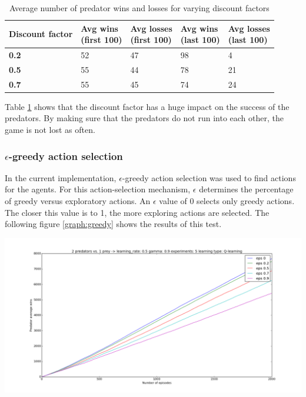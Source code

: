 \begin{table}[H]
\begin{center}
\begin{tabular}{| l | l | l | l | l |}
\hline
\parbox{2cm}{\textbf{Discount factor}} & \parbox{2cm}{\textbf{Avg wins \\ (first 100)}} & \parbox{2cm}{\textbf{Avg losses \\ (first 100)}} & \parbox{2cm}{\textbf{Avg wins \\ (last 100)}} & \parbox{2cm}{\textbf{Avg losses \\ (last 100)}} \\
\hline
\textbf{0.2} & 52 & 47 & 98 & 4 \\
\hline
\textbf{0.5} & 55 & 44 & 78 & 21 \\
\hline
\textbf{0.7} & 55 & 45 & 74 & 24 \\
\hline
\end{tabular}
\caption{Average number of predator wins and losses for varying discount factors}
\label{table:discountfactor}
\end{center}
\end{table}

Table \ref{table:discountfactor} shows that the discount factor has a huge impact on the success of the predators. By making sure that the predators do not run into each other, the game is not lost as often.

\subsubsection{$\epsilon$-greedy action selection}
In the current implementation, $\epsilon$-greedy action selection was used to find actions for the agents. For this action-selection mechanism, $\epsilon$ determines the percentage of greedy versus exploratory actions. An $\epsilon$ value of 0 selects only greedy actions. The closer this value is to 1, the more exploring actions are selected. The following figure \ref{graph:greedy} shows the results of this test.

\begin{center}
	\includegraphics[scale=0.3]{2_predators_epsilon_q_learning}
	\label{graph:greedy}
\end{center}

